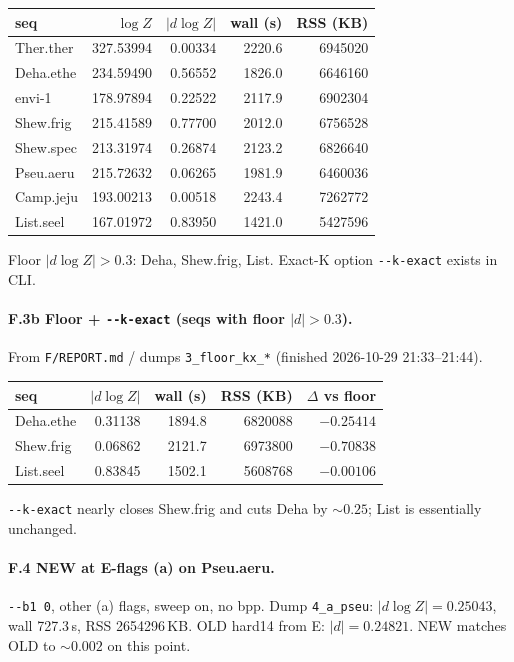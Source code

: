 \documentclass[11pt]{article}
\begin{document}
\begin{center}
\begin{tabular}{@{}lrrrr@{}}
\toprule
seq & $\log Z$ & $|d\log Z|$ & wall (s) & RSS (KB) \\
\midrule
Ther.ther & 327.53994 & 0.00334 & 2220.6 & 6945020 \\
Deha.ethe & 234.59490 & 0.56552 & 1826.0 & 6646160 \\
envi-1 & 178.97894 & 0.22522 & 2117.9 & 6902304 \\
Shew.frig & 215.41589 & 0.77700 & 2012.0 & 6756528 \\
Shew.spec & 213.31974 & 0.26874 & 2123.2 & 6826640 \\
Pseu.aeru & 215.72632 & 0.06265 & 1981.9 & 6460036 \\
Camp.jeju & 193.00213 & 0.00518 & 2243.4 & 7262772 \\
List.seel & 167.01972 & 0.83950 & 1421.0 & 5427596 \\
\bottomrule
\end{tabular}
\end{center}

Floor $|d\log Z|{>}0.3$: Deha, Shew.frig, List. Exact-K option \texttt{-{}-k-exact} exists in CLI.

\paragraph{F.3b Floor + \texttt{-{}-k-exact} (seqs with floor $|d|{>}0.3$).}
From \texttt{F/REPORT.md} / dumps \texttt{3\_floor\_kx\_*} (finished 2026-10-29 21:33--21:44).

\begin{center}
\begin{tabular}{@{}lrrrr@{}}
\toprule
seq & $|d\log Z|$ & wall (s) & RSS (KB) & $\Delta$ vs floor \\
\midrule
Deha.ethe & 0.31138 & 1894.8 & 6820088 & $-0.25414$ \\
Shew.frig & 0.06862 & 2121.7 & 6973800 & $-0.70838$ \\
List.seel & 0.83845 & 1502.1 & 5608768 & $-0.00106$ \\
\bottomrule
\end{tabular}
\end{center}

\texttt{-{}-k-exact} nearly closes Shew.frig and cuts Deha by ${\sim}0.25$; List is essentially unchanged.

\paragraph{F.4 NEW at E-flags (a) on Pseu.aeru.}
\texttt{-{}-b1 0}, other (a) flags, sweep on, no bpp. Dump \texttt{4\_a\_pseu}: $|d\log Z|{=}0.25043$, wall 727.3\,s, RSS 2654296\,KB. OLD hard14 from E: $|d|{=}0.24821$. NEW matches OLD to ${\sim}0.002$ on this point.
\end{document}
